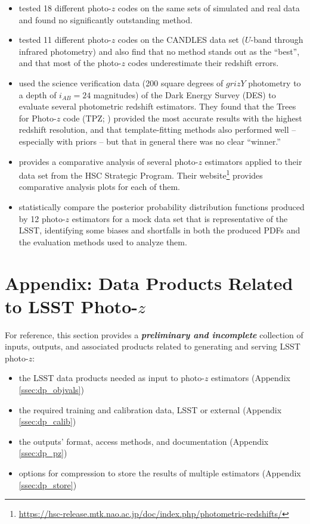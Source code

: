 \documentclass[DM,authoryear,toc]{lsstdoc}
\begin{document}
\begin{itemize}
\item \citet{2010A&A...523A..31H} tested 18 different photo-$z$ codes on the same sets of simulated and real data and found no significantly outstanding method.
\item \citet{2013ApJ...775...93D} tested 11 different photo-$z$ codes on the CANDLES data set ($U$-band through infrared photometry) and also find that no method stands out as the ``best'', and that most of the photo-$z$ codes underestimate their redshift errors.
\item \citet{2014MNRAS.445.1482S} used the science verification data (200 square degrees of $grizY$ photometry to a depth of $i_{AB}=24$ magnitudes) of the Dark Energy Survey (DES) to evaluate several photometric redshift estimators. They found that the Trees for Photo-$z$ code (TPZ; \citet{2013ascl.soft04011C}) provided the most accurate results with the highest redshift resolution, and that template-fitting methods also performed well -- especially with priors -- but that in general there was no clear ``winner.''
\item \citet{2018PASJ...70S...9T} provides a comparative analysis of several photo-$z$ estimators applied to their data set from the HSC Strategic Program. Their website\footnote{\url{https://hsc-release.mtk.nao.ac.jp/doc/index.php/photometric-redshifts/}} provides comparative analysis plots for each of them.
\item \citet{2020MNRAS.499.1587S} statistically compare the posterior probability distribution functions produced by 12 photo-$z$ estimators for a mock data set that is representative of the LSST, identifying some biases and shortfalls in both the produced PDFs and the evaluation methods used to analyze them.
\end{itemize}

\section{Appendix: Data Products Related to LSST Photo-$z$}\label{sec:dp}

For reference, this section provides a \textbf{\textit{preliminary and incomplete}} collection of inputs, outputs, and associated products related to generating and serving LSST photo-$z$:
\begin{itemize}
\item the LSST data products needed as input to photo-$z$ estimators (Appendix \ref{ssec:dp_objvals})
\item the required training and calibration data, LSST or external (Appendix \ref{ssec:dp_calib})
\item the outputs' format, access methods, and documentation (Appendix \ref{ssec:dp_pz})
\item options for compression to store the results of multiple estimators (Appendix \ref{ssec:dp_store})
\end{itemize}
\end{document}
